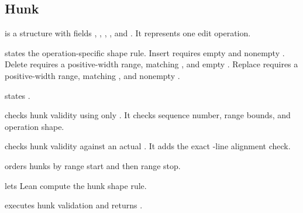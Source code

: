 \subsection{Hunk}

\begin{definition}[Hunk]
\code{[Hunk]} is a structure with fields , , ,
, and . It represents one edit operation.
\end{definition}

\begin{definition}
 states the operation-specific shape rule. Insert
requires empty  and nonempty . Delete requires a
positive-width range, matching , and empty .
Replace requires a positive-width range, matching , and
nonempty .
\end{definition}

\begin{definition}
 states .
\end{definition}

\begin{definition}
 checks hunk validity using only
. It checks sequence number, range bounds, and operation
shape.
\end{definition}

\begin{definition}
 checks hunk validity against an actual
. It adds the exact -line alignment check.
\end{definition}

\begin{definition}
 orders hunks by range start and then range stop.
\end{definition}

\begin{definition}
 lets Lean compute the hunk shape rule.
\end{definition}

\begin{definition}
 executes hunk validation and returns
.
\end{definition}

